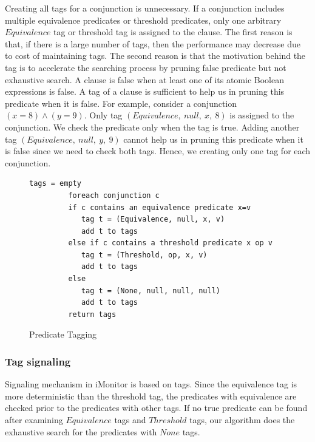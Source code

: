 \documentclass[preprint]{sigplanconf}
\begin{document}
Creating all tags for a conjunction is unnecessary. If a conjunction includes 
multiple equivalence predicates or threshold predicates, only one arbitrary 
$Equivalence$ tag or threshold tag is assigned to the clause. The first reason is 
that, if there is a large number of tags, then the performance may decrease due 
to cost of maintaining tags. The second reason is that the motivation behind 
the tag is to accelerate the searching process by pruning false predicate 
but not exhaustive search.  A clause is false when at least one 
of its atomic Boolean expressions is false. A tag of a clause is sufficient to 
help us in pruning this predicate when it is false. For example, consider a
conjunction $(x = 8) \wedge (y = 9)$. Only tag $(Equivalence,\ null,\ x,\ 8)$
is assigned to the conjunction. We check the predicate only when the tag is
true. Adding another tag $(Equivalence,\ null,\ y,\ 9)$ cannot help us in pruning
this predicate when it is false since we need to check both tags. Hence, we 
creating only one tag for each conjunction.
 
\begin{figure}[ht!]
    \begin{Verbatim}[fontsize=\footnotesize,gobble=8,frame=lines,
            framesep=3mm]
         tags = empty
         foreach conjunction c 
         if c contains an equivalence predicate x=v
            tag t = (Equivalence, null, x, v)
            add t to tags
         else if c contains a threshold predicate x op v
            tag t = (Threshold, op, x, v)
            add t to tags
         else 
            tag t = (None, null, null, null)
            add t to tags
         return tags
    \end{Verbatim}
  \caption{Predicate Tagging}
  \label{fig:tagging}
\end{figure}


\subsubsection{Tag signaling}
Signaling mechanism in iMonitor is based on tags. 
Since the equivalence tag is more deterministic than the threshold tag, the
predicates with equivalence are checked prior to the predicates with other 
tags. If no true predicate can be found after examining $Equivalence$ tags and
$Threshold$ tags, our algorithm does the exhaustive search for the predicates 
with $None$ tags. 
\end{document}

